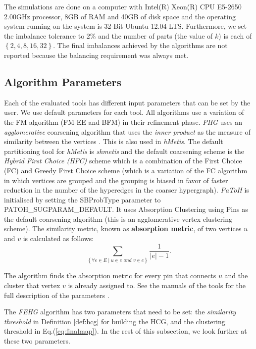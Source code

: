 \documentclass[twocolumn]{svjour3}          \smartqed
\begin{document}
The simulations are done on a computer with Intel(R) Xeon(R) CPU E5-2650 2.00GHz processor, 8GB of RAM and 40GB of disk space and the operating system running on the system is 32-Bit Ubuntu 12.04 LTS. Furthermore, we set the imbalance tolerance to $2\%$ and the number of parts (the value of $k$) is each of $\left\lbrace 2,4,8,16,32 \right\rbrace$. The final imbalances achieved by the algorithms are not reported because the balancing requirement was always met.

\subsection{Algorithm Parameters}\label{sec:fehg_parameters}

Each of the evaluated tools has different input parameters that can be set by the user. We use default parameters for each tool. All algorithms use a variation of the FM algorithm (FM-EE and BFM) in their refinement phase. \textit{PHG} uses an \textit{agglomerative} coarsening algorithm that uses the \textit{inner product} as the measure of similarity between the vertices \cite{devetal2006}. This is also used in \textit{hMetis}. The default partitioning tool for \textit{hMetis} is \textit{shmetis} and the default coarsening scheme is the \textit{Hybrid First Choice (HFC)} scheme which is a combination of the First Choice (FC) \cite{karytech2002} and Greedy First Choice scheme (which is a variation of the FC algorithm in which vertices are grouped and the grouping is biased in favor of faster reduction in the number of the hyperedges in the coarser hypergraph). \textit{PaToH} is initialised by setting the \textsf{SBProbType} parameter to \textsf{PATOH\_SUGPARAM\_DEFAULT}. It uses Absorption Clustering using Pins as the default coarsening algorithm (this is an agglomerative vertex clustering scheme). The similarity metric, known as \textbf{absorption metric}, of two vertices $u$ and $v$ is calculated as follows:
\begin{equation}
\sum_{\left\lbrace \forall e \in E \mid u \in e \textit{ and } v \in e \right\rbrace } \frac{1}{\vert e \vert - 1}.
\end{equation}

The algorithm finds the absorption metric for every pin that connects $u$ and the cluster that vertex $v$ is already assigned to. See the manuals of the tools for the full description of the parameters \cite{ccatalyurek2011patoh,karypis1998hmetis,zoltanurl}.

The \textit{FEHG} algorithm has two parameters that need to be set: the \textit{similarity threshold} in Definition \ref{def:hcg} for building the HCG, and the clustering threshold in Eq.(\ref{eq:finalmap}). In the rest of this subsection, we look further at these two parameters. 
\end{document}
